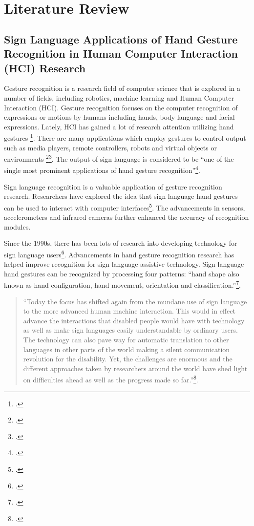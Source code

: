 \chapter{Literature Review}

\section{Sign Language Applications of Hand Gesture Recognition in Human Computer Interaction (HCI) Research}

Gesture recognition is a research field of computer science that is explored in a number of fields, including robotics, machine learning and Human Computer Interaction (HCI). Gesture recognition focuses on the computer recognition of expressions or motions by humans including hands, body language and facial expressions. Lately, HCI has gained a lot of research attention utilizing hand gestures \footcite{Chen2003}. There are many applications which employ gestures to control output such as media players, remote controllers, robots and virtual objects or environments \footcite{Mantyjarvi2004}\footcite{Ong2005}. The output of sign language is considered to be ``one of the single most prominent applications of hand gesture recognition''\footcite{Premaratne2010}.

Sign language recognition is a valuable application of gesture recognition research. Researchers have explored the idea that sign language hand gestures can be used to interact with computer interfaces\footcite{Premaratne2010}. The advancements in sensors, accelerometers and infrared cameras further enhanced the accuracy of recognition modules.

Since the 1990s, there has been lots of research into developing technology for sign language users\footcite{Starner1998}. Advancements in hand gesture recognition research has helped improve recognition for sign language assistive technology. Sign language hand gestures can be recognized by processing four patterns: ``hand shape also known as hand configuration, hand movement, orientation and classification.''\footcite{Zhang2009}.

\begin{quote}
  ``Today the focus has shifted again from the mundane use of sign language to the more advanced human machine interaction. This would in effect advance the interactions that disabled people would have with technology as well as make sign languages easily understandable by ordinary users. The technology can also pave way for automatic translation to other languages in other parts of the world making a silent communication revolution for the disability. Yet, the challenges are enormous and the different approaches taken by researchers around the world have shed light on difficulties ahead as well as the progress made so far.''\footcite{Premaratne2010}. 
\end{quote}

